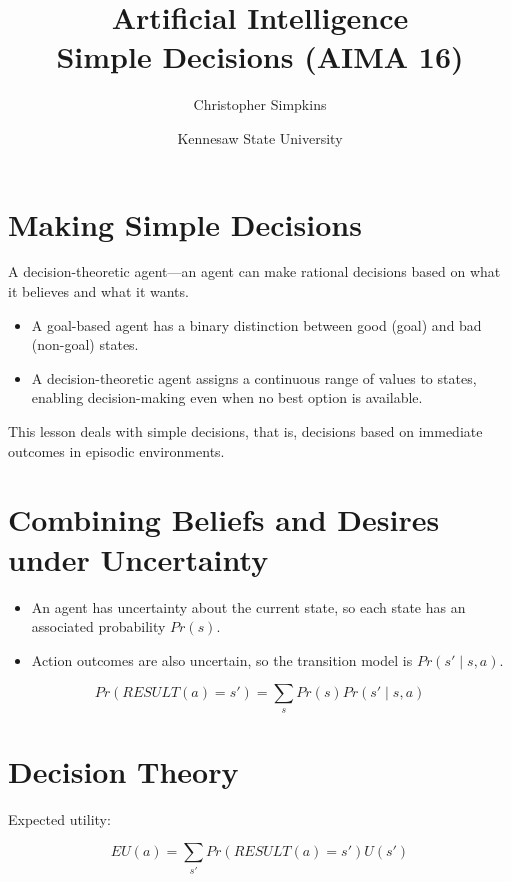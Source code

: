 \documentclass[11pt]{article}
\author{Christopher Simpkins}
\date{Kennesaw State University}
\title{Artificial Intelligence\\\medskip
\large Simple Decisions (AIMA 16)}
\begin{document}
\maketitle
\section{Making Simple Decisions}
\label{sec:orgfe9dbd1}

A decision-theoretic agent—an agent can make rational decisions based on what it believes and what it wants.

\begin{itemize}
\item A goal-based agent has a binary distinction between good (goal) and bad (non-goal) states.

\item A decision-theoretic agent assigns a continuous range of values to states, enabling decision-making even when no best option is available.
\end{itemize}

This lesson deals with simple decisions, that is, decisions based on immediate outcomes in episodic environments.
\section{Combining Beliefs and Desires under Uncertainty}
\label{sec:orgbc89339}

\begin{itemize}
\item An agent has uncertainty about the current state, so each state has an associated probability \(Pr(s)\).

\item Action outcomes are also uncertain, so the transition model is \(Pr(s' \mid s, a)\).
\end{itemize}

\begin{equation*}
Pr(RESULT(a) = s') = \sum_s Pr(s) Pr(s' \mid s, a)
\end{equation*}
\section{Decision Theory}
\label{sec:orgcb8ceb2}

Expected utility:

\begin{equation*}
EU(a) = \sum_{s'} Pr(RESULT(a) = s') U(s') \tag{16.1}
\end{equation*}
\end{document}
